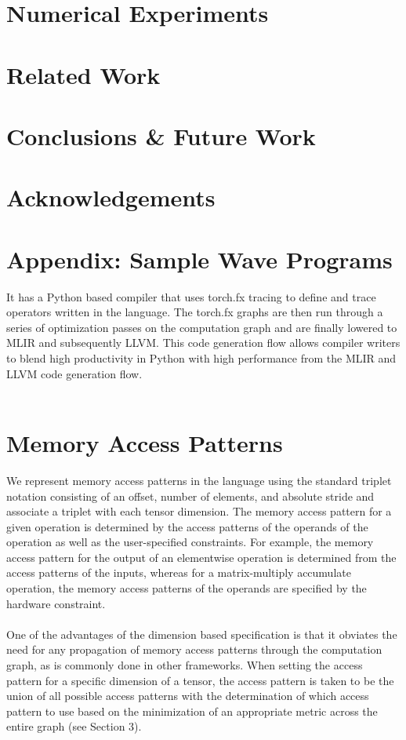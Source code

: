 \documentclass{article}
\begin{document}
\section{Numerical Experiments}
\label{section:numerical_experiments}

\section{Related Work}
\label{section:related_work}

\section{Conclusions \& Future Work}
\label{section:conclusions}

\section{Acknowledgements}
\label{section:acknowledgements}

\section{Appendix: Sample Wave Programs}
\label{section:samples}


\iffalse
It has a Python based compiler that uses torch.fx tracing to define
and trace operators written in the language. The torch.fx graphs are then run through a series of optimization passes
on the computation graph and are finally lowered to MLIR and subsequently LLVM. This code generation flow allows compiler writers
to blend high productivity in Python with high performance from the MLIR and LLVM
code generation flow.
\\ \\


\section{Memory Access Patterns}
We represent memory access patterns in the language using the standard
triplet notation consisting of an offset, number of elements, and absolute stride and associate
a triplet with each tensor dimension. The memory access pattern for a given operation
is determined by the access patterns of the operands of the operation as well as
the user-specified constraints. For example, the memory access pattern for the output
of an elementwise operation is determined from the access patterns of the inputs,
whereas for a matrix-multiply accumulate operation, the memory access patterns of the operands are specified by
the hardware constraint.
\\ \\
One of the advantages of the dimension based specification is that it obviates
the need for any propagation of memory access patterns through the computation graph,
as is commonly done in other frameworks. When setting the access pattern for a specific
dimension of a tensor, the access pattern is taken to be the union of all possible
access patterns with the determination of which access pattern to use based on
the minimization of an appropriate metric across the entire graph (see Section 3).
\end{document}
